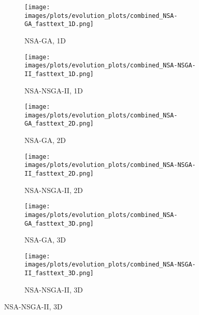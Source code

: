 
        \begin{figure}[htbp]
        \centering    \begin{subfigure}[b]{0.40\textwidth}
        \texttt{[image: images/plots/evolution\_plots/combined\_NSA-GA\_fasttext\_1D.png]}
        \caption{\scriptsize NSA-GA, 1D}
        \label{subfig:fasttext_NSA-GA_1D}
        \end{subfigure}\hspace{0.05\textwidth}
    \begin{subfigure}[b]{0.40\textwidth}
        \texttt{[image: images/plots/evolution\_plots/combined\_NSA-NSGA-II\_fasttext\_1D.png]}
        \caption{\scriptsize NSA-NSGA-II, 1D}
        \label{subfig:fasttext_NSA-NSGA-II_1D}
        \end{subfigure}

    \vspace{0.2cm}
    \begin{subfigure}[b]{0.40\textwidth}
        \texttt{[image: images/plots/evolution\_plots/combined\_NSA-GA\_fasttext\_2D.png]}
        \caption{\scriptsize NSA-GA, 2D}
        \label{subfig:fasttext_NSA-GA_2D}
        \end{subfigure}\hspace{0.05\textwidth}
    \begin{subfigure}[b]{0.40\textwidth}
        \texttt{[image: images/plots/evolution\_plots/combined\_NSA-NSGA-II\_fasttext\_2D.png]}
        \caption{\scriptsize NSA-NSGA-II, 2D}
        \label{subfig:fasttext_NSA-NSGA-II_2D}
        \end{subfigure}

    \vspace{0.2cm}
    \begin{subfigure}[b]{0.40\textwidth}
        \texttt{[image: images/plots/evolution\_plots/combined\_NSA-GA\_fasttext\_3D.png]}
        \caption{\scriptsize NSA-GA, 3D}
        \label{subfig:fasttext_NSA-GA_3D}
        \end{subfigure}\hspace{0.05\textwidth}
    \begin{subfigure}[b]{0.40\textwidth}
        \texttt{[image: images/plots/evolution\_plots/combined\_NSA-NSGA-II\_fasttext\_3D.png]}
        \caption{\scriptsize NSA-NSGA-II, 3D}
        \label{subfig:fasttext_NSA-NSGA-II_3D}
        \end{subfigure}


\end{figure}
